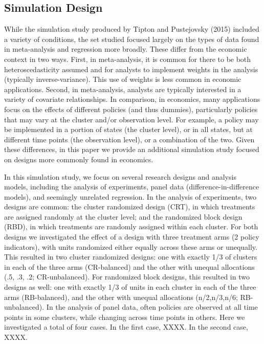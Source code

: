 \documentclass[12pt]{article}\usepackage[]{graphicx}\usepackage[]{color}
\begin{document}
\subsection{Simulation Design}

While the simulation study produced by Tipton and Pustejovsky (2015) included a variety of conditions, the set studied focused largely on the types of data found in meta-analysis and regression more broadly. 
These differ from the economic context in two ways.
First, in meta-analysis, it is common for there to be both heteroscedasticity assumed and for analysts to implement weights in the analysis (typically inverse-variance).
This use of weights is less common in economic applications.
Second, in meta-analysis, analysts are typically interested in a variety of covariate relationships.
In comparison, in economics, many applications focus on the effects of different policies (and thus dummies), particularly policies that may vary at the cluster and/or observation level.
For example, a policy may be implemented in a portion of states (the cluster level), or in all states, but at different time points (the observation level), or a combination of the two.
Given these differences, in this paper we provide an additional simulation study focused on designs more commonly found in economics.

In this simulation study, we focus on several research designs and analysis models, including the analysis of experiments, panel data (difference-in-difference models), and seemingly unrelated regression.
In the analysis of experiments, two designs are common: the cluster randomized design (CRT), in which treatments are assigned randomly at the cluster level; and the randomized block design (RBD), in which treatments are randomly assigned within each cluster.
For both designs we investigated the effect of a design with three treatment arms (2 policy indicators), with units randomized either equally across these arms or unequally. 
This resulted in two cluster randomized designs: one with exactly 1/3 of clusters in each of the three arms (CR-balanced) and the other with unequal allocations (.5, .3, .2; CR-unbalanced).
For randomized block designs, this resulted in two designs as well: one with exactly 1/3 of units in each cluster in each of the three arms (RB-balanced), and the other with unequal allocations (n/2,n/3,n/6; RB-unbalanced).
In the analysis of panel data, often policies are observed at all time points in some clusters, while changing across time points in others.
Here we investigated a total of four cases. 
In the first case, XXXX.
In the second case, XXXX.
\end{document}
